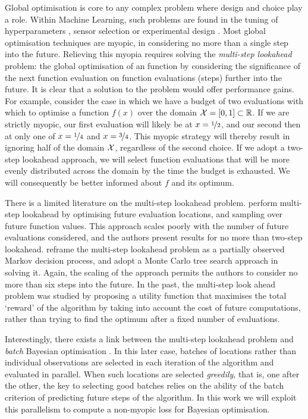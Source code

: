 \documentclass[twoside]{article}
\newcommand{\reals}{\mathbb{R}}
\begin{document}
Global optimisation is core to any complex problem where design and choice play a role. 
Within Machine Learning, such problems are found in the tuning of hyperparameters \citep{Snoek*Larochelle*Adams_2012}, sensor selection \citep{Garnett*Osborne*Roberts_2010} or experimental design \citep{gonzalez2014, martinez-cantin_bayesian_2009}. 
Most global optimisation techniques are myopic, in considering no more than a single step into the future. 
Relieving this myopia requires solving the \emph{multi-step lookahead} problem: the global optimisation of an function by considering the significance of the next function evaluation on function evaluations (steps) further into the future. 
It is clear that a solution to the problem would offer performance gains.
For example, consider the case in which we have a budget of two evaluations with which to optimise a function $f(x)$ over the domain $\inputSpace = [0, 1] \subset \reals$. 
If we are strictly myopic, our first evaluation will likely be at 
$x=\nicefrac{1}{2}$, and our second then at only one of $x=\nicefrac{1}{4}$ and $x=\nicefrac{3}{4}$. 
This myopic strategy will thereby result in ignoring half of the domain $\mathcal{X}$, regardless of the second choice. 
If we adopt a two-step lookahead approach, we will select function evaluations that will be more evenly distributed across the domain by the time the budget is exhausted. 
We will consequently be better informed about $f$ and its optimum.

There is a limited literature on the multi-step lookahead problem.
\cite{osborne_gaussian_2009} perform multi-step lookahead by optimising future evaluation locations, and sampling over future function values. 
This approach scales poorly with the number of future evaluations considered, and the authors present results for no more than two-step lookahead.
\citep{Marchant*Ramos*Sanner*2014} reframe the multi-step lookahead problem as a partially observed Markov decision process, and adopt a Monte Carlo tree search approach in solving it. 
Again, the scaling of the approach permits the authors to consider no more than six steps into the future. In the past, the multi-step look ahead problem was studied by \cite{StreltsovVakili1999} proposing a utility function that maximises the total `reward' of the algorithm by taking into account the cost of future computations, rather than trying to find the optimum after a fixed number of evaluations.

Interestingly, there exists a link between the multi-step lookahead problem and \emph{batch} Bayesian optimisation \citep{Ginsbourger2009,Azimi2012}. In this later case, batches of locations rather than individual observations are selected in each iteration of the algorithm and evaluated in parallel. When such locations are selected \emph{greedily}, that is, one after the other, the key to selecting good batches relies on the ability of the batch criterion of predicting future steps of the algorithm. In this work we will exploit this parallelism to compute a non-myopic loss for Bayesian optimisation. 
\end{document}
